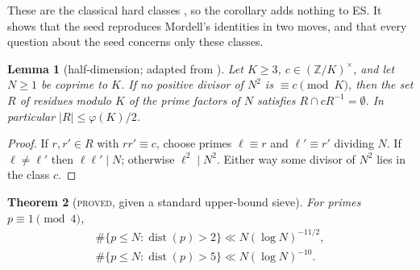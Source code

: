 \documentclass[11pt,reqno]{amsart}
\newtheorem{theorem}{Theorem}[section]
\newtheorem{lemma}[theorem]{Lemma}
\theoremstyle{definition}
\newcommand{\Z}{\mathbb Z}
\newcommand{\dist}{\operatorname{dist}}
\newcommand{\status}[1]{\textsc{#1}}
\begin{document}
These are the classical hard classes \cite{Mordell}, so the corollary adds
nothing to ES.  It shows that the seed reproduces Mordell's identities in
two moves, and that every question about the seed concerns only these
classes.

\begin{lemma}[half-dimension; adapted from {\cite[Lemma~4.2]{Dahan}}]\label{lem:half}
Let $K\ge3$, $c\in(\Z/K)^\times$, and let $N\ge1$ be coprime to $K$.  If no
positive divisor of $N^2$ is $\equiv c\pmod K$, then the set $R$ of residues
modulo $K$ of the prime factors of $N$ satisfies $R\cap cR^{-1}=\emptyset$.
In particular $|R|\le\varphi(K)/2$.
\end{lemma}

\begin{proof}
If $r,r'\in R$ with $rr'\equiv c$, choose primes $\ell\equiv r$ and
$\ell'\equiv r'$ dividing $N$.  If $\ell\ne\ell'$ then $\ell\ell'\mid N$;
otherwise $\ell^2\mid N^2$.  Either way some divisor of $N^2$ lies in the
class $c$.
\end{proof}

\begin{theorem}[\status{proved}, given a standard upper-bound sieve]\label{thm:sieve}
For primes $p\equiv1\pmod4$,
\begin{gather*}
 \#\{p\le N:\dist(p)>2\}\ll N(\log N)^{-11/2},\\
 \#\{p\le N:\dist(p)>5\}\ll N(\log N)^{-10} .
\end{gather*}
\end{theorem}
\end{document}
